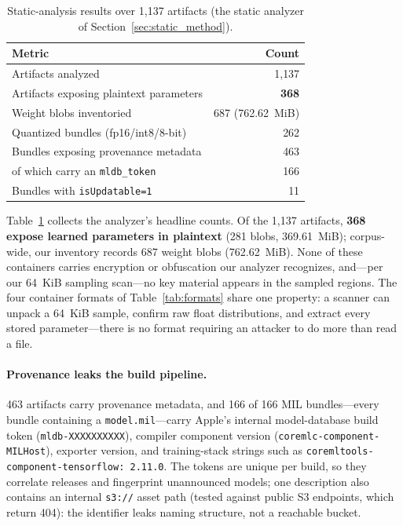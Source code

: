 \documentclass[letterpaper,twocolumn,10pt]{article}
\begin{document}
\begin{table}[t]
\centering
\caption{Static-analysis results over 1{,}137 artifacts
(the static analyzer of Section~\ref{sec:static_method}).}
\label{tab:static}
\scriptsize
\setlength{\tabcolsep}{4pt}
\begin{tabular}{@{}lr@{}}
\toprule
\textbf{Metric} & \textbf{Count} \\
\midrule
Artifacts analyzed & 1{,}137 \\
Artifacts exposing plaintext parameters & \textbf{368} \\
Weight blobs inventoried & 687 (762.62~MiB) \\
Quantized bundles (fp16/int8/8-bit) & 262 \\
Bundles exposing provenance metadata & 463 \\
\quad of which carry an \texttt{mldb\_token} & 166 \\
Bundles with \texttt{isUpdatable=1} & 11 \\
\bottomrule
\end{tabular}
\end{table}

Table~\ref{tab:static} collects the analyzer's headline counts.
Of the 1{,}137 artifacts, \textbf{368 expose learned parameters in
plaintext} (281 blobs, 369.61~MiB); corpus-wide, our inventory records
687 weight blobs (762.62~MiB). None of these containers carries
encryption or obfuscation our analyzer recognizes, and---per our
64~KiB sampling scan---no key material appears in the sampled regions.
The four container formats of Table~\ref{tab:formats} share one property: a
scanner can unpack a 64~KiB sample, confirm raw float distributions, and
extract every stored parameter---there is no format requiring an attacker
to do more than read a file.

\paragraph{Provenance leaks the build pipeline.}
463 artifacts carry provenance metadata, and 166 of 166 MIL bundles---every
bundle containing a \texttt{model.mil}---carry Apple's internal
model-database build token (\texttt{mldb-}\allowbreak\texttt{XXXXXXXXXX}), compiler component
version (\texttt{coremlc-}\allowbreak\texttt{component-}\allowbreak\texttt{MILHost}), exporter version, and
training-stack strings such as
\texttt{coremltools-}\allowbreak\texttt{component-}\allowbreak\texttt{tensorflow:~2.11.0}.
The tokens are unique per build, so they correlate releases and fingerprint
unannounced models; one description also contains an internal \texttt{s3://}
asset path (tested against public S3 endpoints, which return 404): the
identifier leaks naming structure, not a reachable bucket.
\end{document}
